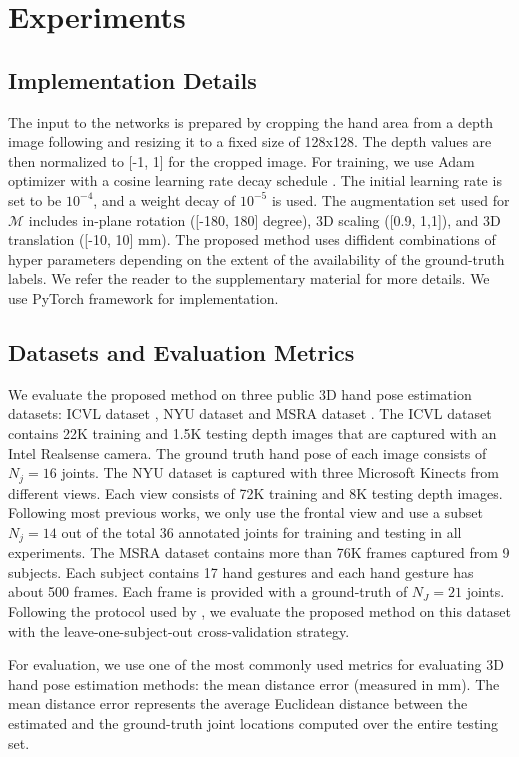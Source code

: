 \documentclass{article}
\begin{document}
\section{Experiments}
\subsection{Implementation Details}
The input to the networks is prepared by cropping the hand area from a depth image following  \cite{oberweger2017deepprior++} and resizing it to a fixed size of 128x128. The depth values are then normalized to [-1, 1] for the cropped image. For training, we use Adam \cite{kingma2014adam} optimizer with a cosine learning rate decay schedule \cite{loshchilov2016sgdr}. The initial learning rate is set to be $10^{-4}$, and a weight decay of $10^{-5}$ is used.  The augmentation set used for $\mathcal{M}$ includes in-plane rotation ([-180, 180] degree), 3D scaling ([0.9, 1,1]), and 3D translation ([-10, 10] mm). The proposed method uses diffident combinations of hyper parameters depending on the extent of the availability of the ground-truth labels. We refer the reader to the supplementary material for more details. We use PyTorch framework \cite{paszke2019pytorch} for implementation. 



\subsection{Datasets and Evaluation Metrics}
We evaluate the proposed method on three public 3D hand pose estimation datasets: ICVL dataset \cite{tang2014latent}, NYU dataset \cite{tompson2014real} and MSRA dataset \cite{sun2015cascaded}. The ICVL dataset contains 22K training and 1.5K testing depth images that are
captured with an Intel Realsense camera. The ground truth hand pose of each image consists of $N_j = 16$ joints. The NYU dataset is captured with three Microsoft Kinects from different views. Each view consists of 72K training and 8K testing depth images. Following most previous works, we only use the frontal view and use a subset $N_j = 14$ out of the total 36 annotated joints for training and testing in all experiments. The MSRA dataset \cite{sun2015cascaded} contains more than 76K frames captured from 9 subjects. Each subject contains 17 hand gestures and each hand gesture has about 500 frames. Each frame is provided with a ground-truth of $N_J = 21$ joints. Following the protocol used by \cite{sun2015cascaded}, we evaluate the proposed method on this dataset with the leave-one-subject-out cross-validation strategy.
\par
For evaluation, we use one of the most commonly used metrics for evaluating 3D hand pose estimation methods: the mean distance error (measured in mm). The mean distance error represents the average Euclidean distance between the estimated and the ground-truth joint locations computed over the entire testing set.
\end{document}
